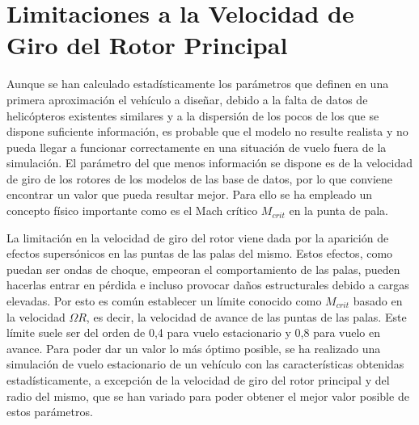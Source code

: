 \section{Limitaciones a la Velocidad de Giro del Rotor Principal}

Aunque se han calculado estadísticamente los parámetros que definen en una primera aproximación el vehículo a diseñar, debido a la falta de datos de helicópteros existentes similares y a la dispersión de los pocos de los que se dispone suficiente información, es probable que el modelo no resulte realista y no pueda llegar a funcionar correctamente en una situación de vuelo fuera de la simulación. El parámetro del que menos información se dispone es de la velocidad de giro de los rotores de los modelos de las base de datos, por lo que conviene encontrar un valor que pueda resultar mejor. Para ello se ha empleado un concepto físico importante como es el Mach crítico $M_{crit}$ en la punta de pala.

La limitación en la velocidad de giro del rotor viene dada por la aparición de efectos supersónicos en las puntas de las palas del mismo. Estos efectos, como puedan ser ondas de choque, empeoran el comportamiento de las palas, pueden hacerlas entrar en pérdida e incluso provocar daños estructurales debido a cargas elevadas.
Por esto es común establecer un límite conocido como $M_{crit}$ basado en la velocidad $\Omega R$, es decir, la velocidad de avance de las puntas de las palas. Este límite suele ser del orden de 0,4 para vuelo estacionario y 0,8 para vuelo en avance. 
Para poder dar un valor lo más óptimo posible, se ha realizado una simulación de vuelo estacionario de un vehículo con las características obtenidas estadísticamente, a excepción de la velocidad de giro del rotor principal y del radio del mismo, que se han variado para poder obtener el mejor valor posible de estos parámetros.


